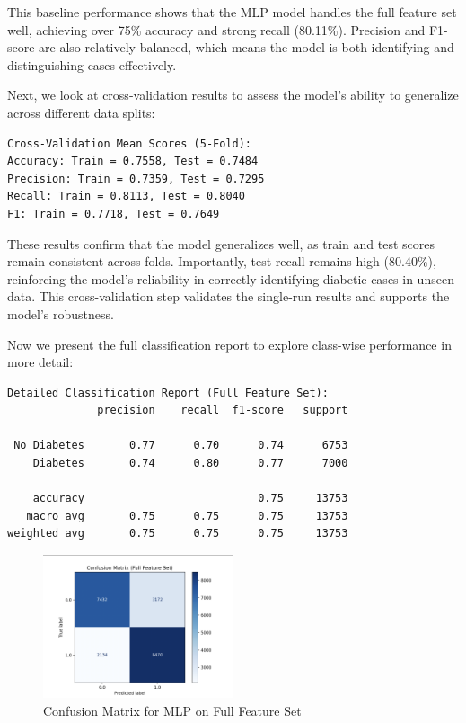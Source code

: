 \noindent
This baseline performance shows that the MLP model handles the full feature set well, achieving over 75\% accuracy and strong recall (80.11\%). Precision and F1-score are also relatively balanced, which means the model is both identifying and distinguishing cases effectively.

\vspace{0.5em}
\noindent
Next, we look at cross-validation results to assess the model’s ability to generalize across different data splits:

\begin{verbatim}
Cross-Validation Mean Scores (5-Fold):
Accuracy: Train = 0.7558, Test = 0.7484
Precision: Train = 0.7359, Test = 0.7295
Recall: Train = 0.8113, Test = 0.8040
F1: Train = 0.7718, Test = 0.7649
\end{verbatim}

\noindent
These results confirm that the model generalizes well, as train and test scores remain consistent across folds. Importantly, test recall remains high (80.40\%), reinforcing the model’s reliability in correctly identifying diabetic cases in unseen data. This cross-validation step validates the single-run results and supports the model’s robustness.

\vspace{0.5em}
\noindent
Now we present the full classification report to explore class-wise performance in more detail:

\begin{verbatim}
Detailed Classification Report (Full Feature Set):
              precision    recall  f1-score   support

 No Diabetes       0.77      0.70      0.74      6753
    Diabetes       0.74      0.80      0.77      7000

    accuracy                           0.75     13753
   macro avg       0.75      0.75      0.75     13753
weighted avg       0.75      0.75      0.75     13753
\end{verbatim}

\begin{figure}[H]
    \centering
    \includegraphics[width=0.5\textwidth]{images/confusion_matrix_full.png}
    \caption{Confusion Matrix for MLP on Full Feature Set}
\end{figure}

